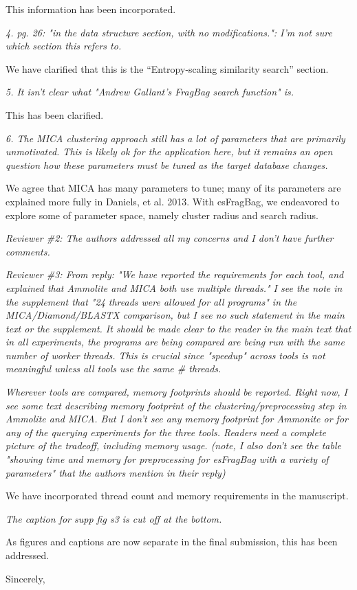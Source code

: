 \documentclass[12pt]{letter}
\begin{document}
\begin{letter}{}
This information has been incorporated.

\emph{4. pg. 26: "in the data structure section, with no modifications.": I'm not
sure which section this refers to.}

We have clarified that this is the ``Entropy-scaling similarity search'' section.

\emph{5. It isn't clear what "Andrew Gallant's FragBag search function" is.}

This has been clarified.

\emph{6. The MICA clustering approach still has a lot of parameters that are
primarily unmotivated. This is likely ok for the application here, but it
remains an open question how these parameters must be tuned as the target
database changes.}

We agree that MICA has many parameters to tune; many of its parameters are explained more fully in Daniels, et al. 2013.
With esFragBag, we endeavored to explore some of parameter space, namely cluster radius and search radius.




\emph{Reviewer \#2: The authors addressed all my concerns and I don't have further comments.}


\emph{Reviewer \#3: From reply: "We have reported the requirements for each tool, and explained that Ammolite and MICA both use multiple threads." I see the note in the supplement that "24 threads were allowed for all programs" in the MICA/Diamond/BLASTX comparison, but I see no such statement in the main text or the supplement. It should be made clear to the reader in the main text that in all experiments, the programs are being compared are being run with the same number of worker threads. This is crucial since "speedup" across tools is not meaningful unless all tools use the same \# threads.}

\emph{Wherever tools are compared, memory footprints should be reported. Right now, I see some text describing memory footprint of the clustering/preprocessing step in Ammolite and MICA. But I don't see any memory footprint for Ammonite or for any of the querying experiments for the three tools. Readers need a complete picture of the tradeoff, including memory usage. (note, I also don't see the table "showing time and memory for preprocessing for esFragBag with a variety of parameters" that the authors mention in their reply)}

We have incorporated thread count and memory requirements in the manuscript.

\emph{The caption for supp fig s3 is cut off at the bottom.}

As figures and captions are now separate in the final submission, this has been addressed.

\closing{\hspace*{.5in}Sincerely,}
\end{letter} 
\end{document}
